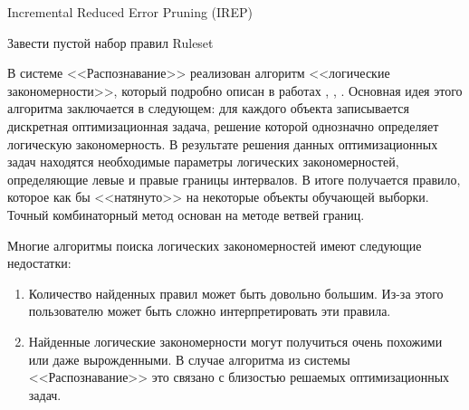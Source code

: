 \documentclass[12pt]{article}
\begin{document}
\begin{algorithm}[\text]
  \caption{Incremental Reduced Error Pruning (IREP)}\label{algo:IREP}
   {
    Завести пустой набор правил Ruleset\;
    \;
  }
\end{algorithm}

В системе <<Распознавание>> реализован алгоритм <<логические
закономерности>>, который подробно описан в работах \cite{kovshov08},
\cite{ryazanov07logic}, \cite{recognition06}. Основная идея этого
алгоритма заключается в следующем: для каждого объекта записывается
дискретная оптимизационная задача, решение которой однозначно
определяет логическую закономерность. В результате решения данных
оптимизационных задач находятся необходимые параметры логических
закономерностей, определяющие левые и правые границы интервалов. В
итоге получается правило, которое как бы <<натянуто>> на некоторые
объекты обучающей выборки. Точный комбинаторный метод основан на
методе ветвей границ.

Многие алгоритмы поиска логических закономерностей имеют следующие
недостатки:

\begin{enumerate}
\item Количество найденных правил может быть довольно большим. Из-за
  этого пользователю может быть сложно интерпретировать эти правила.
\item Найденные логические закономерности могут получиться очень
  похожими или даже вырожденными. В случае алгоритма из системы
  <<Распознавание>> это связано с близостью решаемых оптимизационных
  задач.
\end{enumerate}
\end{document}
